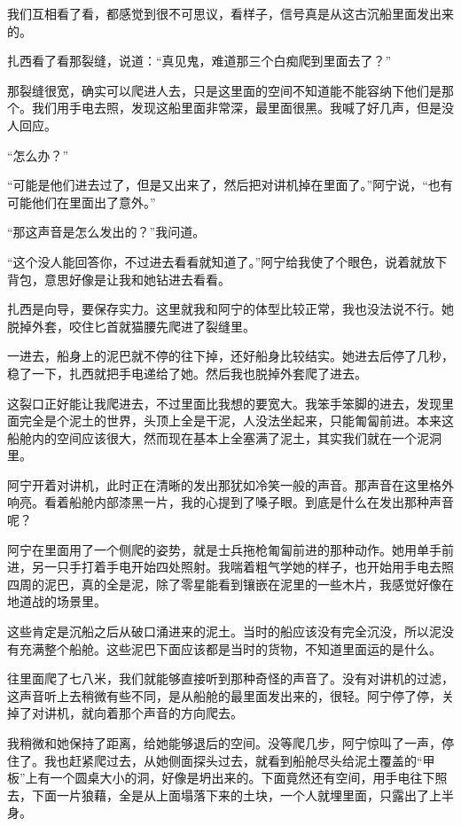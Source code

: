 我们互相看了看，都感觉到很不可思议，看样子，信号真是从这古沉船里面发出来的。

扎西看了看那裂缝，说道：“真见鬼，难道那三个白痴爬到里面去了？”

那裂缝很宽，确实可以爬进人去，只是这里面的空间不知道能不能容纳下他们是那个。我们用手电去照，发现这船里面非常深，最里面很黑。我喊了好几声，但是没人回应。

“怎么办？”

“可能是他们进去过了，但是又出来了，然后把对讲机掉在里面了。”阿宁说，“也有可能他们在里面出了意外。”

“那这声音是怎么发出的？”我问道。

“这个没人能回答你，不过进去看看就知道了。”阿宁给我使了个眼色，说着就放下背包，意思好像是让我和她钻进去看看。

扎西是向导，要保存实力。这里就我和阿宁的体型比较正常，我也没法说不行。她脱掉外套，咬住匕首就猫腰先爬进了裂缝里。

一进去，船身上的泥巴就不停的往下掉，还好船身比较结实。她进去后停了几秒，稳了一下，扎西就把手电递给了她。然后我也脱掉外套爬了进去。

这裂口正好能让我爬进去，不过里面比我想的要宽大。我笨手笨脚的进去，发现里面完全是个泥土的世界，头顶上全是干泥，人没法坐起来，只能匍匐前进。本来这船舱内的空间应该很大，然而现在基本上全塞满了泥土，其实我们就在一个泥洞里。

阿宁开着对讲机，此时正在清晰的发出那犹如冷笑一般的声音。那声音在这里格外响亮。看着船舱内部漆黑一片，我的心提到了嗓子眼。到底是什么在发出那种声音呢？

阿宁在里面用了一个侧爬的姿势，就是士兵拖枪匍匐前进的那种动作。她用单手前进，另一只手打着手电开始四处照射。我喘着粗气学她的样子，也开始用手电去照四周的泥巴，真的全是泥，除了零星能看到镶嵌在泥里的一些木片，我感觉好像在地道战的场景里。

这些肯定是沉船之后从破口涌进来的泥土。当时的船应该没有完全沉没，所以泥没有充满整个船舱。这些泥巴下面应该都是当时的货物，不知道里面运的是什么。

往里面爬了七八米，我们就能够直接听到那种奇怪的声音了。没有对讲机的过滤，这声音听上去稍微有些不同，是从船舱的最里面发出来的，很轻。阿宁停了停，关掉了对讲机，就向着那个声音的方向爬去。

我稍微和她保持了距离，给她能够退后的空间。没等爬几步，阿宁惊叫了一声，停住了。我也赶紧爬过去，从她侧面探头过去，就看到船舱尽头给泥土覆盖的“甲板”上有一个圆桌大小的洞，好像是坍出来的。下面竟然还有空间，用手电往下照去，下面一片狼藉，全是从上面塌落下来的土块，一个人就埋里面，只露出了上半身。

